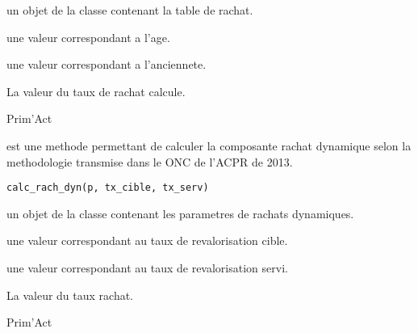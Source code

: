 \documentclass[a4paper]{book}
\begin{document}
%
\begin{Arguments}
\begin{ldescription}
\item[\code{table\_rach}] un objet de la classe  contenant la table de rachat.

\item[\code{age}] une valeur  correspondant a l'age.

\item[\code{anc}] une valeur  correspondant a l'anciennete.
\end{ldescription}
\end{Arguments}
%
\begin{Value}
La valeur du taux de rachat calcule.
\end{Value}
%
\begin{Author}\relax
Prim'Act
\end{Author}
%
\begin{Description}\relax
{} est une methode permettant de calculer la composante rachat dynamique
selon la methodologie transmise dans le ONC de l'ACPR de 2013.
\end{Description}
%
\begin{Usage}
\begin{verbatim}
calc_rach_dyn(p, tx_cible, tx_serv)
\end{verbatim}
\end{Usage}
%
\begin{Arguments}
\begin{ldescription}
\item[\code{p}] un objet de la classe  contenant les parametres de rachats dynamiques.

\item[\code{tx\_cible}] une valeur  correspondant au taux de revalorisation cible.

\item[\code{tx\_serv}] une valeur  correspondant au taux de revalorisation servi.
\end{ldescription}
\end{Arguments}
%
\begin{Value}
La valeur du taux rachat.
\end{Value}
%
\begin{Author}\relax
Prim'Act
\end{Author}
\end{document}
